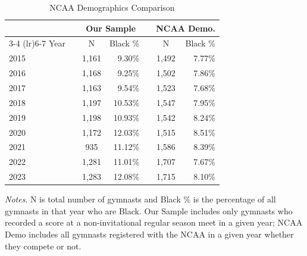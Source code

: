 \documentclass[12pt]{article}
\begin{document}
\begin{table}[htbp]
    \centering
    \begin{threeparttable}
    
        \caption{NCAA Demographics Comparison}
        
        \begin{tabular}{lccrccr}
            \toprule
             & & \multicolumn{2}{c}{Our Sample} & & \multicolumn{2}{c}{NCAA Demo.} \\
            \cmidrule(lr){3-4} \cmidrule(lr){6-7}
            Year & & N & Black \% & & N & Black \% \\
            \midrule
            2015 & & 1,161 & 9.30\% & & 1,492 & 7.77\% \\
            2016 & & 1,168 & 9.25\% & & 1,502 & 7.86\% \\
            2017 & & 1,163 & 9.54\% & & 1,523 & 7.68\% \\
            2018 & & 1,197 & 10.53\% & & 1,547 & 7.95\% \\
            2019 & & 1,198 & 10.93\% & & 1,542 & 8.24\% \\
            2020 & & 1,172 & 12.03\% & & 1,515 & 8.51\% \\
            2021 & & 935 & 11.12\% & & 1,586 & 8.39\% \\
            2022 & & 1,281 & 11.01\% & & 1,707 & 7.67\% \\
            2023 & & 1,283 & 12.08\% & & 1,715 & 8.10\% \\
            \bottomrule
        \end{tabular}

        \begin{tablenotes}[flushleft] %
            \small
            \item \textit{Notes}. N is total number of gymnasts and Black \% is the percentage of all gymnasts in that year who are Black. Our Sample includes only gymnasts who recorded a score at a non-invitational regular season meet in a given year; NCAA Demo includes all gymnasts registered with the NCAA in a given year whether they compete or not.
        \end{tablenotes}
        
    \end{threeparttable}
\end{table}

\clearpage
\end{document}
